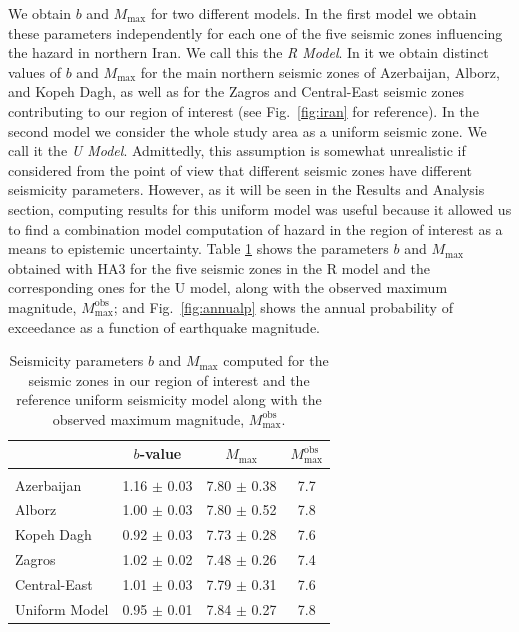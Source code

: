 We obtain $b$ and $M_{\max}$ for two different models. In the first model we obtain these parameters independently for each one of the five seismic zones influencing the hazard in northern Iran. We call this the \textit{R Model}. In it we obtain distinct values of $b$ and $M_{\max}$ for the main northern seismic zones of Azerbaijan, Alborz, and Kopeh Dagh, as well as for the Zagros and Central-East seismic zones contributing to our region of interest (see Fig.~\ref{fig:iran} for reference). In the second model we consider the whole study area as a uniform seismic zone. We call it the \textit{U Model}. Admittedly, this assumption is somewhat unrealistic if considered from the point of view that different seismic zones have different seismicity parameters. However, as it will be seen in the Results and Analysis section, computing results for this uniform model was useful because it allowed us to find a combination model computation of hazard in the region of interest as a means to  epistemic uncertainty. Table \ref{tab:params} shows the parameters $b$ and $M_{\max}$ obtained with HA3 for the five seismic zones in the R model and the corresponding ones for the U model, along with the observed maximum magnitude, $M_{\max}^{\mathrm{obs}}$; and Fig.~\ref{fig:annualp} shows the annual probability of exceedance as a function of earthquake magnitude.

\begin{table}%
    \centering
    \caption{Seismicity parameters $b$ and $M_{\max}$ computed for the seismic zones in our region of interest and the reference uniform seismicity model along with the observed maximum magnitude, $M_{\max}^{\mathrm{obs}}$.}
    \begin{tabular}{@{\hspace{0.2ex}}lccc@{\hspace{0.2ex}}}
        \cline{2-4}                                                                         \\[-1.6ex]
                        & $b$-value         & $M_{\max}$        & $M_{\max}^{\mathrm{obs}}$ \\[0.6ex]
        \hline                                                                              \\[-1.6ex]
        Azerbaijan      & 1.16 $\pm$ 0.03   & 7.80 $\pm$ 0.38   & 7.7                       \\
        Alborz          & 1.00 $\pm$ 0.03   & 7.80 $\pm$ 0.52   & 7.8                       \\
        Kopeh Dagh      & 0.92 $\pm$ 0.03   & 7.73 $\pm$ 0.28   & 7.6                       \\
        Zagros          & 1.02 $\pm$ 0.02   & 7.48 $\pm$ 0.26   & 7.4                       \\
        Central-East    & 1.01 $\pm$ 0.03   & 7.79 $\pm$ 0.31   & 7.6                       \\
        Uniform Model   & 0.95 $\pm$ 0.01   & 7.84 $\pm$ 0.27   & 7.8                       \\[0.5ex]
        \hline 
    \end{tabular}
    \label{tab:params} 
\end{table}

